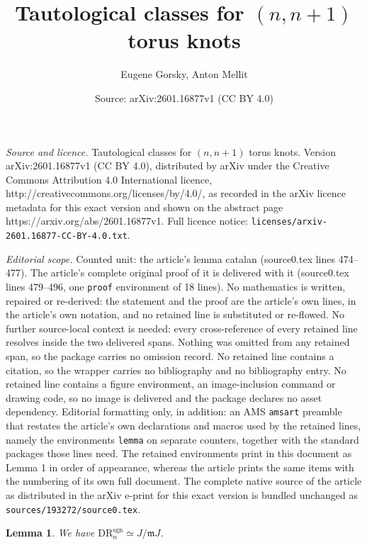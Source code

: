 \documentclass[10pt,a4paper]{amsart}
\title{Tautological classes for $(n,n+1)$ torus knots}
\author{Eugene Gorsky, Anton Mellit}
\date{Source: arXiv:2601.16877v1 (CC BY 4.0)}
\newtheorem{lemma}{Lemma}
\newcommand{\DR}{\mathrm{DR}}
\newcommand{\mm}{\mathfrak{m}}
\newcommand{\sgn}{\mathrm{sgn}}
\begin{document}
\maketitle

\noindent\emph{Source and licence.} Tautological classes for $(n,n+1)$ torus knots. Version arXiv:2601.16877v1 (CC BY 4.0), distributed by arXiv under the Creative Commons Attribution 4.0 International licence, http://creativecommons.org/licenses/by/4.0/, as recorded in the arXiv licence metadata for this exact version and shown on the abstract page https://arxiv.org/abs/2601.16877v1. Full licence notice: \texttt{licenses/arxiv-2601.16877-CC-BY-4.0.txt}.\par\smallskip

\noindent\textit{Editorial scope.} Counted unit: the article's lemma catalan (source0.tex lines 474--477). The article's complete original proof of it is delivered with it (source0.tex lines 479--496, one \texttt{proof} environment of 18 lines). No mathematics is written, repaired or re-derived: the statement and the proof are the article's own lines, in the article's own notation, and no retained line is substituted or re-flowed.  No further source-local context is needed: every cross-reference of every retained line resolves inside the two delivered spans.  Nothing was omitted from any retained span, so the package carries no omission record.  No retained line contains a citation, so the wrapper carries no bibliography and no bibliography entry.  No retained line contains a figure environment, an image-inclusion command or drawing code, so no image is delivered and the package declares no asset dependency.  Editorial formatting only, in addition: an AMS \texttt{amsart} preamble that restates the article's own declarations and macros used by the retained lines, namely the environments \texttt{lemma} on separate counters, together with the standard packages those lines need.  The retained environments print in this document as Lemma 1 in order of appearance, whereas the article prints the same items with the numbering of its own full document.  The complete native source of the article as distributed in the arXiv e-print for this exact version is bundled unchanged as \texttt{sources/193272/source0.tex}.
\begin{lemma}
\label{lem: catalan}
We have $\DR_n^{\sgn}\simeq J/\mm J$.
\end{lemma}
\end{document}
